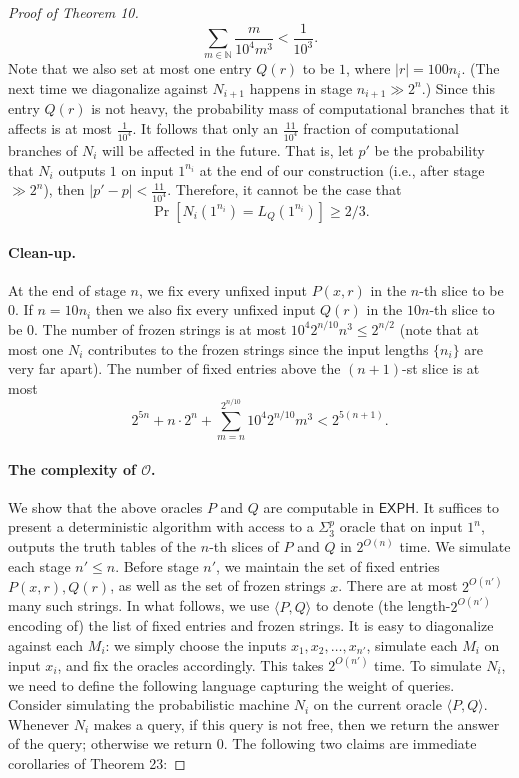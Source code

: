 \begin{proof}[Proof of Theorem 10]
\[\sum_{m\in\mathbb N}\frac{m}{10^4m^3}<\frac{1}{10^3}.\]
Note that we also set at most one entry $Q(r)$ to be $1$, where $|r|=100n_i$. (The next time we diagonalize against $N_{i+1}$ happens in stage $n_{i+1}\gg2^n$.) Since this entry $Q(r)$ is not heavy, the probability mass of computational branches that it affects is at most $\frac{1}{10^4}$.
It follows that only an $\frac{11}{10^4}$ fraction of computational branches of $N_i$ will be affected in the future. That is, let $p'$ be the probability that $N_i$ outputs $1$ on input $1^{n_i}$ at the end of our construction (i.e., after stage $\gg2^n$), then $|p'-p|<\frac{11}{10^4}$. Therefore, it cannot be the case that
\[\Pr[N_i(1^{n_i})=L_Q(1^{n_i})]\geq2/3.\]
\paragraph{Clean-up.}
At the end of stage $n$, we fix every unfixed input $P(x,r)$ in the $n$-th slice to be $0$. If $n=10n_i$ then we also fix every unfixed input $Q(r)$ in the $10n$-th slice to be $0$. The number of frozen strings is at most $10^4 2^{n/10}n^3\leq2^{n/2}$ (note that at most one $N_i$ contributes to the frozen strings since the input lengths $\{n_i\}$ are very far apart). The number of fixed entries above the $(n+1)$-st slice is at most
\[2^{5n}+n\cdot2^n+\sum_{m=n}^{2^{n/10}}10^4 2^{n/10}m^3<2^{5(n+1)}.\]
\paragraph{The complexity of $\mathcal O$.}
We show that the above oracles $P$ and $Q$ are computable in $\mathsf{EXPH}$. It suffices to present a deterministic algorithm with access to a $\Sigma^p_3$ oracle that on input $1^n$, outputs the truth tables of the $n$-th slices of $P$ and $Q$ in $2^{O(n)}$ time.
We simulate each stage $n'\leq n$. Before stage $n'$, we maintain the set of fixed entries $P(x,r),Q(r)$, as well as the set of frozen strings $x$. There are at most $2^{O(n')}$ many such strings. In what follows, we use $\langle P,Q\rangle$ to denote (the length-$2^{O(n')}$ encoding of) the list of fixed entries and frozen strings.
It is easy to diagonalize against each $M_i$: we simply choose the inputs $x_1,x_2,\ldots,x_{n'}$, simulate each $M_i$ on input $x_i$, and fix the oracles accordingly. This takes $2^{O(n')}$ time.
To simulate $N_i$, we need to define the following language capturing the weight of queries. Consider simulating the probabilistic machine $N_i$ on the current oracle $\langle P,Q\rangle$. Whenever $N_i$ makes a query, if this query is not free, then we return the answer of the query; otherwise we return $0$. The following two claims are immediate corollaries of Theorem 23:

\end{proof}
